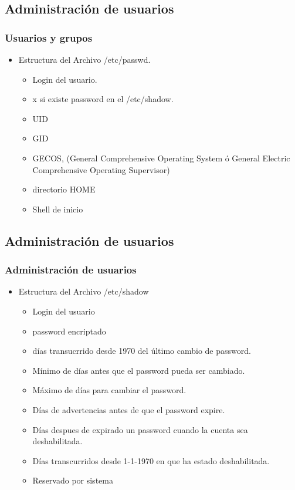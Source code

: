 \documentclass{beamer}
\begin{document}
\subsection{Administraci\'on de usuarios}
\begin{frame}
\frametitle{Usuarios y grupos}
\begin{itemize}
        \item Estructura del Archivo /etc/passwd.
                \begin{itemize}
                \item Login del usuario.
                \item x si existe password en el /etc/shadow.
                \item UID
                \item GID
                \item GECOS, (General Comprehensive Operating System \'o General Electric Comprehensive Operating Supervisor)
                \item directorio HOME
                \item Shell de inicio
                \end{itemize}
\end{itemize}
\end{frame}


\subsection{Administraci\'on de usuarios}
\begin{frame}
\frametitle{Administraci\'on de usuarios}
\begin{itemize}
\item Estructura del Archivo /etc/shadow
        \begin{itemize}
        \item Login del usuario
        \item password encriptado
        \item d\'ias transucrrido desde 1970 del \'ultimo cambio de password.
        \item M\'inimo de d\'ias antes que el password pueda ser cambiado.
        \item M\'aximo de d\'ias para cambiar el password.
        \item D\'ias de advertencias antes de que el password expire.
        \item D\'ias despues de expirado un password cuando la cuenta sea deshabilitada.
        \item D\'ias transcurridos desde 1-1-1970 en que ha estado deshabilitada.
        \item Reservado por sistema
        \end{itemize}
\end{itemize}
\end{frame}
\end{document}
